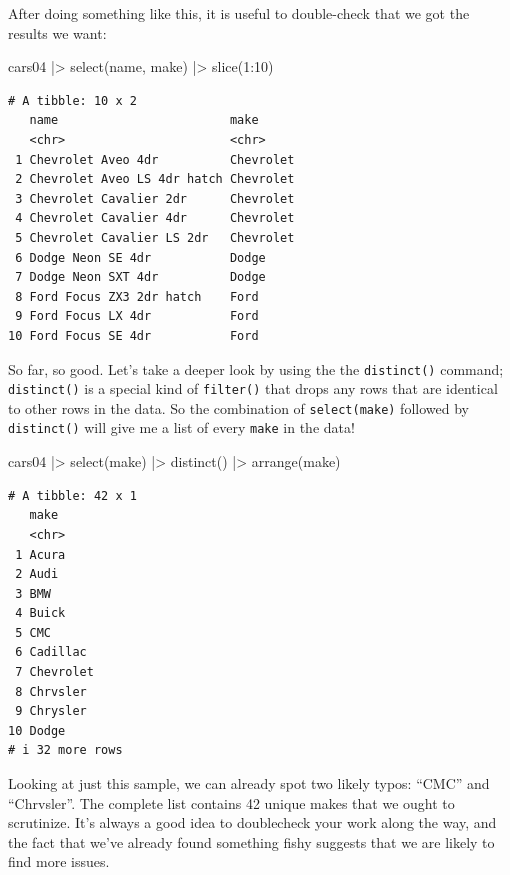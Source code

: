 \documentclass[
  letterpaper,
]{book}
\newenvironment{Shaded}{\begin{snugshade}}{\end{snugshade}}
\newcommand{\DecValTok}[1]{\textcolor[rgb]{0.68,0.00,0.00}{#1}}
\newcommand{\FunctionTok}[1]{\textcolor[rgb]{0.28,0.35,0.67}{#1}}
\newcommand{\NormalTok}[1]{\textcolor[rgb]{0.00,0.23,0.31}{#1}}
\newcommand{\SpecialCharTok}[1]{\textcolor[rgb]{0.37,0.37,0.37}{#1}}
\begin{document}
After doing something like this, it is useful to double-check that we
got the results we want:

\begin{Shaded}
\begin{Highlighting}[]
\NormalTok{cars04 }\SpecialCharTok{|\textgreater{}} 
  \FunctionTok{select}\NormalTok{(name, make) }\SpecialCharTok{|\textgreater{}} 
  \FunctionTok{slice}\NormalTok{(}\DecValTok{1}\SpecialCharTok{:}\DecValTok{10}\NormalTok{)}
\end{Highlighting}
\end{Shaded}

\begin{verbatim}
# A tibble: 10 x 2
   name                        make     
   <chr>                       <chr>    
 1 Chevrolet Aveo 4dr          Chevrolet
 2 Chevrolet Aveo LS 4dr hatch Chevrolet
 3 Chevrolet Cavalier 2dr      Chevrolet
 4 Chevrolet Cavalier 4dr      Chevrolet
 5 Chevrolet Cavalier LS 2dr   Chevrolet
 6 Dodge Neon SE 4dr           Dodge    
 7 Dodge Neon SXT 4dr          Dodge    
 8 Ford Focus ZX3 2dr hatch    Ford     
 9 Ford Focus LX 4dr           Ford     
10 Ford Focus SE 4dr           Ford     
\end{verbatim}

So far, so good. Let's take a deeper look by using the the
\texttt{distinct()} command; \texttt{distinct()} is a special kind of
\texttt{filter()} that drops any rows that are identical to other rows
in the data. So the combination of \texttt{select(make)} followed by
\texttt{distinct()} will give me a list of every \texttt{make} in the
data!

\begin{Shaded}
\begin{Highlighting}[]
\NormalTok{cars04 }\SpecialCharTok{|\textgreater{}} 
  \FunctionTok{select}\NormalTok{(make) }\SpecialCharTok{|\textgreater{}} 
  \FunctionTok{distinct}\NormalTok{() }\SpecialCharTok{|\textgreater{}} 
  \FunctionTok{arrange}\NormalTok{(make)}
\end{Highlighting}
\end{Shaded}

\begin{verbatim}
# A tibble: 42 x 1
   make     
   <chr>    
 1 Acura    
 2 Audi     
 3 BMW      
 4 Buick    
 5 CMC      
 6 Cadillac 
 7 Chevrolet
 8 Chrvsler 
 9 Chrysler 
10 Dodge    
# i 32 more rows
\end{verbatim}

Looking at just this sample, we can already spot two likely typos:
``CMC'' and ``Chrvsler''. The complete list contains 42 unique makes
that we ought to scrutinize. It's always a good idea to doublecheck your
work along the way, and the fact that we've already found something
fishy suggests that we are likely to find more issues.
\end{document}
